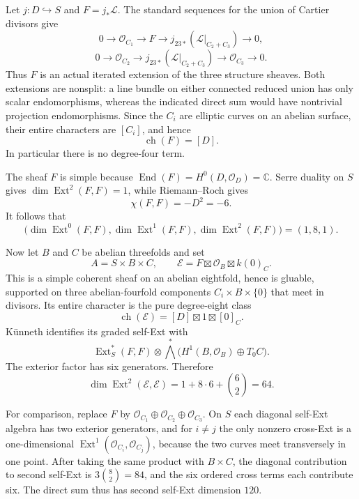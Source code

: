 \documentclass[11pt]{article}
\theoremstyle{definition}
\theoremstyle{remark}
\begin{document}
Let $j:D\hookrightarrow S$ and $F=j_*\mathcal L$.
The standard sequences for the union of Cartier divisors give
\[
 0\longrightarrow\mathcal O_{C_1}\longrightarrow F
 \longrightarrow j_{23*}(\mathcal L|_{C_2+C_3})
 \longrightarrow0,
\]
\[
 0\longrightarrow\mathcal O_{C_2}
 \longrightarrow j_{23*}(\mathcal L|_{C_2+C_3})
 \longrightarrow\mathcal O_{C_3}\longrightarrow0.
\]
Thus $F$ is an actual iterated extension of the three structure
sheaves.  Both extensions are nonsplit: a line bundle on either
connected reduced union has only scalar endomorphisms, whereas
the indicated direct sum would have nontrivial projection
endomorphisms.  Since the $C_i$ are elliptic curves on an abelian
surface, their entire characters are $[C_i]$, and hence
\[
 \operatorname{ch}(F)=[D].
\]
In particular there is no degree-four term.

The sheaf $F$ is simple because
$\operatorname{End}(F)=H^0(D,\mathcal O_D)=\mathbb C$.
Serre duality on $S$ gives $\dim\operatorname{Ext}^2(F,F)=1$,
while Riemann--Roch gives
\[
 \chi(F,F)=-D^2=-6.
\]
It follows that
\[
 \bigl(\dim\operatorname{Ext}^0(F,F),
        \dim\operatorname{Ext}^1(F,F),
        \dim\operatorname{Ext}^2(F,F)\bigr)=(1,8,1).
\]

Now let $B$ and $C$ be abelian threefolds and set
\[
 A=S\times B\times C,
 \qquad\mathcal E=F\boxtimes\mathcal O_B\boxtimes k(0)_C.
\]
This is a simple coherent sheaf on an abelian eightfold, hence is
gluable, supported on three abelian-fourfold components
$C_i\times B\times\{0\}$ that meet in divisors.
Its entire character is the pure degree-eight class
\[
 \operatorname{ch}(\mathcal E)=[D]\boxtimes1\boxtimes[0]_C.
\]
K\"unneth identifies its graded self-Ext with
\[
 \operatorname{Ext}^*_S(F,F)\otimes
 \bigwedge^*\bigl(H^1(B,\mathcal O_B)\oplus T_0C\bigr).
\]
The exterior factor has six generators.  Therefore
\[
 \dim\operatorname{Ext}^2(\mathcal E,\mathcal E)
       =1+8\cdot6+\binom62=64.
\]

For comparison, replace $F$ by
$\mathcal O_{C_1}\oplus\mathcal O_{C_2}\oplus\mathcal O_{C_3}$.
On $S$ each diagonal self-Ext algebra has two exterior generators,
and for $i\ne j$ the only nonzero cross-Ext is a one-dimensional
$\operatorname{Ext}^1(\mathcal O_{C_i},\mathcal O_{C_j})$,
because the two curves meet transversely in one point.
After taking the same product with $B\times C$, the diagonal
contribution to second self-Ext is $3\binom82=84$, and the six
ordered cross terms each contribute six.  The direct sum thus
has second self-Ext dimension $120$.
\end{document}
